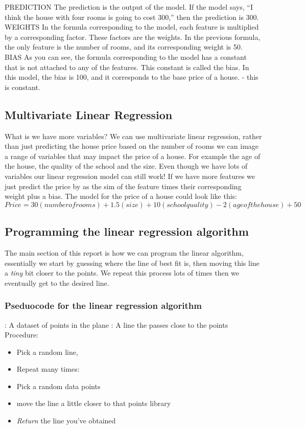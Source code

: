 \documentclass{report}
\begin{document}
PREDICTION
The prediction is the output of the model. If the model says, “I think the house with four rooms is going to cost 300,” then the prediction is 300.\\

WEIGHTS
In the formula corresponding to the model, each feature is multiplied by a corresponding factor. These factors are the weights. In the previous formula, the only feature is the number of rooms, and its corresponding weight is 50. \\

BIAS
As you can see, the formula corresponding to the model has a constant that is not attached to any of the features. This constant is called the bias. In this model, the bias is 100, and it corresponds to the base price of a house. - this is constant.\\
\subsection{Multivariate Linear Regression}
What is we have more variables? We can use multivariate linear regression, rather than just predicting the house price based on the number of rooms we can image a range of variables that may impact the price of a house. For example the age of the house, the quality of the school and the size. Even though we have lots of variables our linear regression model can still work! If we have more features we just predict the price by as the sim of the feature times their corresponding weight plus a bias. The model for the price of a house could look like this: $$Price = 30(number of rooms) + 1.5(size) + 10(school quality) -2(age of the house) + 50$$

\subsection{Programming the linear regression algorithm}
The main section of this report is how we can program the linear algorithm, essentially we start by guessing where the line of best fit is, then moving this line a \emph{tiny} bit closer to the points. We repeat this process lots of times then we eventually get to the desired line.

\subsubsection{Pseduocode for the linear regression algorithm}

: A dataset of points in the plane
: A line the passes close to the points
Procedure:
\begin{itemize}
\item Pick a random line,
\item Repeat many times:
\item Pick a random data points
\item move the line a little closer to that points library
\item \emph{Return} the line you've obtained
\end{itemize}
\end{document}
